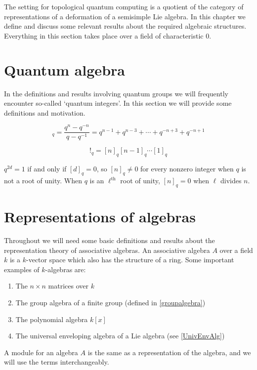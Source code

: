 The setting for topological quantum computing is a quotient of the category of
representations of a deformation of a semisimple Lie algebra. In this chapter
we define and discuss some relevant results about the required algebraic
structures. Everything in this section takes place over a field of
characteristic 0.

\section{Quantum algebra}

In the definitions and results involving quantum groups we will frequently
encounter so-called `quantum integers'. In this section we will provide some
definitions and motivation.

\begin{equation}
    [n]_q = \frac{q^n - q^{-n}}{q - q^{-1}} = q^{n-1} + q^{n-3} + \cdots + q^{-n+3} + q^{-n+1}
\end{equation}

\begin{equation}
    [n]!_q = [n]_q [n-1]_q \cdots [1]_q
\end{equation}

$q^{2d}=1$ if and only if $[d]_q = 0$, so $[n]_q \neq 0$ for every nonzero
integer when $q$ is not a root of unity. When $q$ is an $\ell^\text{th}$ root of unity, $[n]_q = 0$ when $\ell$ divides $n$.


\section{Representations of algebras}

Throughout we will need some basic definitions and results about the
representation theory of associative algebras. An associative algebra $A$ over a field $k$ is a
$k$-vector space which also has the structure of a ring. Some important examples of $k$-algebras are: 

\begin{enumerate}
    \item The $n \times n$ matrices over $k$
    \item The group algebra of a finite group (defined in \ref{groupalgebra})
    \item The polynomial algebra $k[x]$
    \item The universal enveloping algebra of a Lie algebra (see \ref{UnivEnvAlg})
\end{enumerate}

A module for an algebra $A$ is the same as a representation of the algebra, and
we will use the terms interchangeably. 

